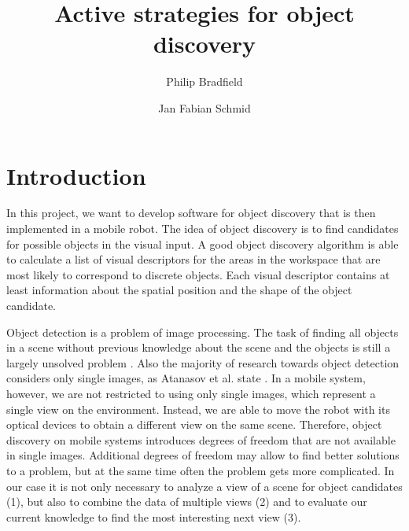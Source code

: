 \documentclass[a4paper,11pt,english]{article}
\begin{document}
\title{Active strategies for object discovery}
\author{Philip Bradfield \and Jan Fabian Schmid}
	
\maketitle 

\section{Introduction}
In this project, we want to develop software for object discovery that is then implemented in a mobile robot.
The idea of object discovery is to find candidates for possible objects in the visual input. A good object discovery algorithm is able to calculate a list of visual descriptors for the areas in the workspace that are most likely to correspond to discrete objects.
Each visual descriptor contains at least information about the spatial position and the shape of the object candidate.

Object detection is a problem of image processing. The task of finding all objects in a scene without previous knowledge about the scene and the objects is still a largely unsolved problem \cite{garcia2013computational}.
Also the majority of research towards object detection considers only single images, as Atanasov et al. state \cite{atanasov2014nonmyopic}.
In a mobile system, however, we are not restricted to using only single images, which represent a single view on the environment. Instead, we are able to move the robot with its optical devices to obtain a different view on the same scene.
Therefore, object discovery on mobile systems introduces degrees of freedom that are not available in single images.
Additional degrees of freedom may allow to find better solutions to a problem, but at the same time often the problem gets more complicated.
In our case it is not only necessary to analyze a view of a scene for object candidates (1), but also to combine the data of multiple views (2) and to evaluate our current knowledge to find the most interesting next view (3).
\end{document}
